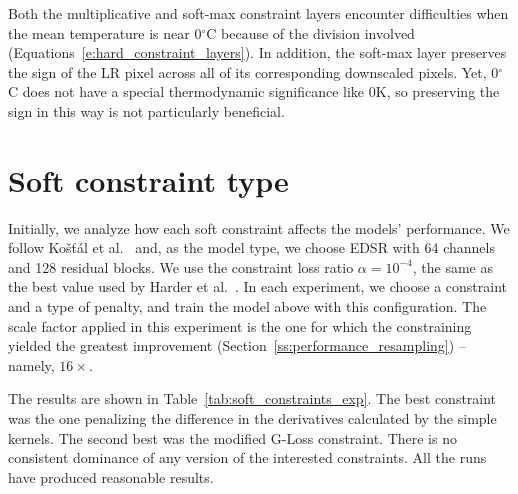Both the multiplicative and soft-max constraint layers encounter difficulties when the mean temperature is near 0$^\circ$C because of the division involved (Equations~\eqref{e:hard_constraint_layers}).
In addition, the soft-max layer preserves the sign of the LR pixel across all of its corresponding downscaled pixels.
Yet, 0$^\circ$C does not have a special thermodynamic significance like 0K, so preserving the sign in this way is not particularly beneficial.

\section{Soft constraint type}
\label{s:constraints_exp}

Initially, we analyze how each soft constraint affects the models' performance.
We follow Košťál et al.~\cite{Kostal2025} and, as the model type, we choose EDSR with 64 channels and 128 residual blocks.
We use the constraint loss ratio $\alpha = 10^{-4}$, the same as the best value used by Harder et al.~\cite{Harder2023}.
In each experiment, we choose a constraint and a type of penalty, and train the model above with this configuration. 
The scale factor applied in this experiment is the one for which the constraining yielded the greatest improvement (Section~\ref{ss:performance_resampling}) -- namely, $16\times$.

The results are shown in Table~\ref{tab:soft_constraints_exp}.
The best constraint was the one penalizing the difference in the derivatives calculated by the simple kernels.
The second best was the modified G-Loss constraint.
There is no consistent dominance of any version of the interested constraints.
All the runs have produced reasonable results.

